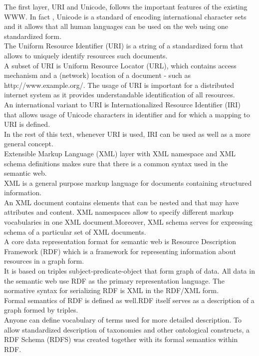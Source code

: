 \documentclass[a4paper,12pt,oneside]{report}
\begin{document}
{{  The first layer, URI and Unicode, follows the important features of the existing WWW. In fact , Unicode is a standard of encoding international character sets and it allows that all human languages can be used on the web using one standardized form.\\
 The Uniform Resource Identifier (URI) is a string of a standardized form that allows to uniquely identify resources such documents. \\
A subset of URI is Uniform Resource Locator (URL), which contains access mechanism and a (network) location of a document - such as http://www.example.org/. The usage of URI is important for a distributed internet system as it provides understandable identification of all resources.\\
 An international variant to URI is Internationalized Resource Identifier (IRI) that allows usage of Unicode characters in identifier and for which a mapping to URI is defined. \\
In the rest of this text, whenever URI is used, IRI can be used as well as a more general concept.\\
Extensible Markup Language (XML) layer with XML namespace and XML schema definitions makes sure that there is a common syntax used in the semantic web.\\
 XML is a general purpose markup language for documents containing structured information. \\
An XML document contains elements that can be nested and that may have attributes and content. XML namespaces allow to specify different markup vocabularies in one XML document.Moreover, XML schema serves for expressing schema of a particular set of XML documents.\\
A core data representation format for semantic web is Resource Description Framework (RDF) which is a framework for representing information about resources in a graph form. \\
It is based on triples subject-predicate-object that form graph of data. All data in the semantic web use RDF as the primary representation language. The normative syntax for serializing RDF is XML in the RDF/XML form.\\
 Formal semantics of RDF is defined as well.RDF itself serves as a description of a graph formed by triples.\\
Anyone can define vocabulary of terms used for more detailed description. To allow standardized description of taxonomies and other ontological constructs, a RDF Schema (RDFS) was created together with its formal semantics within RDF.\\
}}
\end{document}

